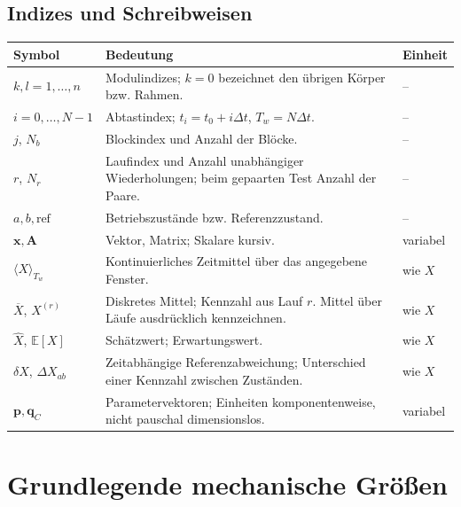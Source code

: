 \documentclass[11pt,a4paper]{article}
\makeatletter
\newcommand{\E}{\mathbb{E}}
\newenvironment{symtab}{\begin{longtable}{@{}L{.22\textwidth}L{.62\textwidth}L{.12\textwidth}@{}}\toprule\textbf{Symbol}&\textbf{Bedeutung}&\textbf{Einheit}\\\midrule\endhead}{\bottomrule\end{longtable}}
\makeatother
\begin{document}
\subsection{Indizes und Schreibweisen}
\begin{symtab}
$k,l=1,\ldots,n$&Modulindizes; $k=0$ bezeichnet den übrigen Körper bzw. Rahmen.&--\\
$i=0,\ldots,N-1$&Abtastindex; $t_i=t_0+i\Delta t$, $T_w=N\Delta t$.&--\\
$j$, $N_b$&Blockindex und Anzahl der Blöcke.&--\\
$r$, $N_r$&Laufindex und Anzahl unabhängiger Wiederholungen; beim gepaarten Test Anzahl der Paare.&--\\
$a,b,\mathrm{ref}$&Betriebszustände bzw. Referenzzustand.&--\\
$\mathbf x,\mathbf A$&Vektor, Matrix; Skalare kursiv.&variabel\\
$\langle X\rangle_{T_w}$&Kontinuierliches Zeitmittel über das angegebene Fenster.&wie $X$\\
$\overline X$, $X^{(r)}$&Diskretes Mittel; Kennzahl aus Lauf $r$. Mittel über Läufe ausdrücklich kennzeichnen.&wie $X$\\
$\hat X$, $\E[X]$&Schätzwert; Erwartungswert.&wie $X$\\
$\delta X$, $\Delta X_{ab}$&Zeitabhängige Referenzabweichung; Unterschied einer Kennzahl zwischen Zuständen.&wie $X$\\
$\mathbf p,\mathbf q_C$&Parametervektoren; Einheiten komponentenweise, nicht pauschal dimensionslos.&variabel\\
\end{symtab}

\section{Grundlegende mechanische Größen}
\end{document}
